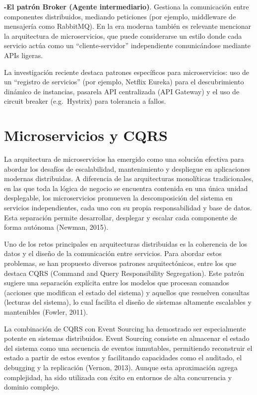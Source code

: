 \documentclass[
  11pt,
  letterpaper,
]{article}
\begin{document}
\textbf{-El patrón Broker (Agente intermediario)}. Gestiona la
comunicación entre componentes distribuidos, mediando peticiones (por
ejemplo, middleware de mensajería como RabbitMQ). En la era moderna
también es relevante mencionar la arquitectura de microservicios, que
puede considerarse un estilo donde cada servicio actúa como un
``cliente-servidor'' independiente comunicándose mediante APIs ligeras.

La investigación reciente destaca patrones específicos para
microservicios: uso de un ``registro de servicios'' (por ejemplo,
Netflix Eureka) para el descubrimiento dinámico de instancias, pasarela
API centralizada (API Gateway) y el uso de circuit breaker
(e.g.~Hystrix) para tolerancia a fallos.

\section{Microservicios y CQRS}\label{microservicios-y-cqrs}

La arquitectura de microservicios ha emergido como una solución efectiva
para abordar los desafíos de escalabilidad, mantenimiento y despliegue
en aplicaciones modernas distribuidas. A diferencia de las arquitecturas
monolíticas tradicionales, en las que toda la lógica de negocio se
encuentra contenida en una única unidad desplegable, los microservicios
promueven la descomposición del sistema en servicios independientes,
cada uno con su propia responsabilidad y base de datos. Esta separación
permite desarrollar, desplegar y escalar cada componente de forma
autónoma (Newman, 2015).

Uno de los retos principales en arquitecturas distribuidas es la
coherencia de los datos y el diseño de la comunicación entre servicios.
Para abordar estos problemas, se han propuesto diversos patrones
arquitectónicos, entre los que destaca CQRS (Command and Query
Responsibility Segregation). Este patrón sugiere una separación
explícita entre los modelos que procesan comandos (acciones que
modifican el estado del sistema) y aquellos que resuelven consultas
(lecturas del sistema), lo cual facilita el diseño de sistemas altamente
escalables y mantenibles (Fowler, 2011).

La combinación de CQRS con Event Sourcing ha demostrado ser
especialmente potente en sistemas distribuidos. Event Sourcing consiste
en almacenar el estado del sistema como una secuencia de eventos
inmutables, permitiendo reconstruir el estado a partir de estos eventos
y facilitando capacidades como el auditado, el debugging y la
replicación (Vernon, 2013). Aunque esta aproximación agrega complejidad,
ha sido utilizada con éxito en entornos de alta concurrencia y dominio
complejo.
\end{document}

